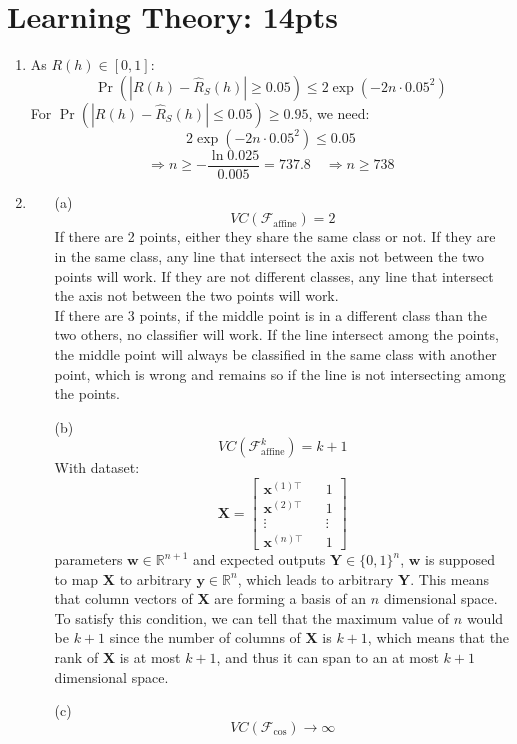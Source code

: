 \documentclass[12pt]{article}
\begin{document}
\section{Learning Theory: 14pts}
\begin{enumerate}
    \item As $R(h) \in [0, 1]$:
    \[\Pr(|R(h) - \hat{R}_S(h)|\geq0.05)\leq2\exp\left(-2n\cdot0.05^2\right)\]
    For $\Pr(|R(h) - \hat{R}_S(h)|\leq0.05)\geq0.95$, we need:
    \[2\exp\left(-2n\cdot0.05^2\right)\leq0.05\] 
    \[\Rightarrow n\geq-\frac{\ln0.025}{0.005} = 737.8 \quad\Rightarrow n\geq738\]
    \item
\begin{enumerate}
    \item[(a)] \[VC(\mathcal{F}_\text{affine}) = 2\]
    If there are 2 points, either they share the same class or not. If they are in the same class, 
    any line that intersect the axis not between the two points will work. If they are not different
    classes, any line that intersect the axis not between the two points will work.\\
    If there are 3 points, if the middle point is in a different class than the two others, no classifier
    will work. If the line intersect among the points, the middle point will always be classified in
    the same class with another point, which is wrong and remains so if the line is not intersecting
    among the points.
    \item[(b)] \[VC(\mathcal{F}_\text{affine}^k) = k+1\]
    With dataset:
    \[\textbf{X} = \begin{bmatrix}
        \boldsymbol{x}^{(1)\top} && 1\\
        \boldsymbol{x}^{(2)\top} && 1\\
        \vdots && \vdots\\
        \boldsymbol{x}^{(n)\top} && 1
    \end{bmatrix}\]
    parameters $\boldsymbol{w}\in\mathbb{R}^{n+1}$ and expected outputs $\textbf{Y}\in\{0, 1\}^n$,
    $\boldsymbol{w}$ is supposed to map \textbf{X} to arbitrary $\textbf{y}\in\mathbb{R}^n$,
    which leads to arbitrary \textbf{Y}. This means that column vectors of \textbf{X} are forming a
    basis of an $n$ dimensional space. To satisfy this condition, we can tell that the maximum value of
    $n$ would be $k+1$ since the number of columns of \textbf{X} is $k+1$, which means that the rank of
    \textbf{X} is at most $k+1$, and thus it can span to an at most $k+1$ dimensional space.
    \item[(c)] \[VC(\mathcal{F}_\text{cos}) \rightarrow \infty\]

\end{enumerate}
\end{enumerate}
\end{document}

